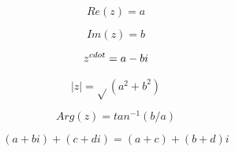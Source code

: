 \[Re(z) = a\]

\[Im(z) = b\]

\[z^{\\cdot } = a - bi\]

\[|z| = \sqrt{}(a^{2} + b^{2})\]

\[Arg(z) = tan^{-1}(b/a)\]

\[(a+bi) + (c+di) = (a+c) + (b+d)i\]

